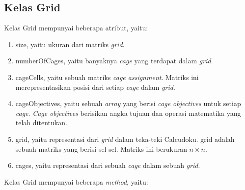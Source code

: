 \subsection{Kelas Grid}
\label{sec:kelasgrid}

Kelas Grid mempunyai beberapa atribut, yaitu:

\begin{enumerate}
\item size, yaitu ukuran dari matriks \textit{grid}.
\item numberOfCages, yaitu banyaknya \textit{cage} yang terdapat dalam \textit{grid}.
\item cageCells, yaitu sebuah matriks \textit{cage assignment}. Matriks ini merepresentasikan posisi dari setiap \textit{cage} dalam \textit{grid}.
\item cageObjectives, yaitu sebuah \textit{array} yang berisi \textit{cage objectives} untuk setiap \textit{cage}. \textit{Cage objectives} berisikan angka tujuan dan operasi matematika yang telah ditentukan.
\item grid, yaitu representasi dari \textit{grid} dalam teka-teki Calcudoku. grid adalah sebuah matriks yang berisi sel-sel. Matriks ini berukuran \begin{math} n \times n\end{math}.
\item cages, yaitu representasi dari sebuah \textit{cage} dalam sebuah \textit{grid}.
\end{enumerate}

Kelas Grid mempunyai beberapa \textit{method}, yaitu:


